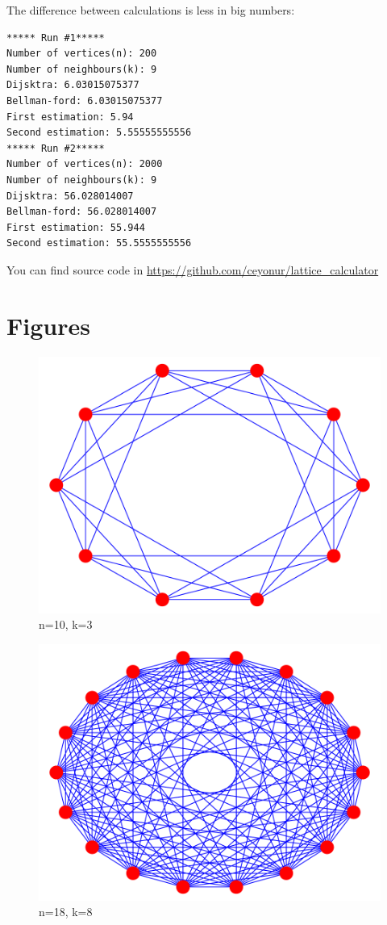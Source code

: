 \documentclass[11pt]{article}
\begin{document}
The difference between calculations is less in big numbers:
\begin{verbatim}
***** Run #1*****
Number of vertices(n): 200
Number of neighbours(k): 9
Dijsktra: 6.03015075377
Bellman-ford: 6.03015075377
First estimation: 5.94
Second estimation: 5.55555555556
***** Run #2*****
Number of vertices(n): 2000
Number of neighbours(k): 9
Dijsktra: 56.028014007
Bellman-ford: 56.028014007
First estimation: 55.944
Second estimation: 55.5555555556
\end{verbatim}

You can find source code in \url{https://github.com/ceyonur/lattice_calculator}
\printbibliography[
heading=bibintoc,
title={References}
]
\pagebreak
\section*{Figures}
\begin{figure}[h]
    \centering
    \includegraphics[trim={0 0 0 0},clip, scale=0.9]{n10k3.pdf}
    \caption{n=10, k=3}
    \label{fig:figure-4}
\end{figure}

\begin{figure}[h]
    \centering
    \includegraphics[trim={0 0 0 0},clip, scale=0.9]{n18k8.pdf}
    \caption{n=18, k=8}
    \label{fig:figure-4}
\end{figure}
\end{document}
